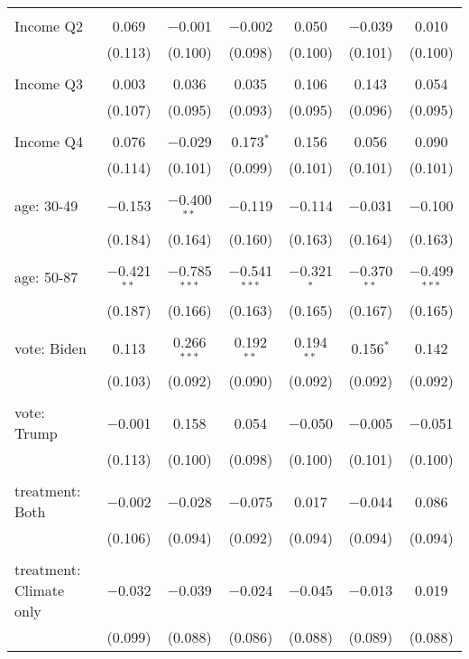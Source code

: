 \begin{tabular}{@{\extracolsep{5pt}}lcccccc}
  & & & & & & \\ 
 Income Q2 & 0.069 & $-$0.001 & $-$0.002 & 0.050 & $-$0.039 & 0.010 \\ 
  & (0.113) & (0.100) & (0.098) & (0.100) & (0.101) & (0.100) \\ 
  & & & & & & \\ 
 Income Q3 & 0.003 & 0.036 & 0.035 & 0.106 & 0.143 & 0.054 \\ 
  & (0.107) & (0.095) & (0.093) & (0.095) & (0.096) & (0.095) \\ 
  & & & & & & \\ 
 Income Q4 & 0.076 & $-$0.029 & 0.173$^{*}$ & 0.156 & 0.056 & 0.090 \\ 
  & (0.114) & (0.101) & (0.099) & (0.101) & (0.101) & (0.101) \\ 
  & & & & & & \\ 
 age: 30-49 & $-$0.153 & $-$0.400$^{**}$ & $-$0.119 & $-$0.114 & $-$0.031 & $-$0.100 \\ 
  & (0.184) & (0.164) & (0.160) & (0.163) & (0.164) & (0.163) \\ 
  & & & & & & \\ 
 age: 50-87 & $-$0.421$^{**}$ & $-$0.785$^{***}$ & $-$0.541$^{***}$ & $-$0.321$^{*}$ & $-$0.370$^{**}$ & $-$0.499$^{***}$ \\ 
  & (0.187) & (0.166) & (0.163) & (0.165) & (0.167) & (0.165) \\ 
  & & & & & & \\ 
 vote: Biden & 0.113 & 0.266$^{***}$ & 0.192$^{**}$ & 0.194$^{**}$ & 0.156$^{*}$ & 0.142 \\ 
  & (0.103) & (0.092) & (0.090) & (0.092) & (0.092) & (0.092) \\ 
  & & & & & & \\ 
 vote: Trump & $-$0.001 & 0.158 & 0.054 & $-$0.050 & $-$0.005 & $-$0.051 \\ 
  & (0.113) & (0.100) & (0.098) & (0.100) & (0.101) & (0.100) \\ 
  & & & & & & \\ 
 treatment: Both & $-$0.002 & $-$0.028 & $-$0.075 & 0.017 & $-$0.044 & 0.086 \\ 
  & (0.106) & (0.094) & (0.092) & (0.094) & (0.094) & (0.094) \\ 
  & & & & & & \\ 
 treatment: Climate only & $-$0.032 & $-$0.039 & $-$0.024 & $-$0.045 & $-$0.013 & 0.019 \\ 
  & (0.099) & (0.088) & (0.086) & (0.088) & (0.089) & (0.088) \\ 

\end{tabular}

